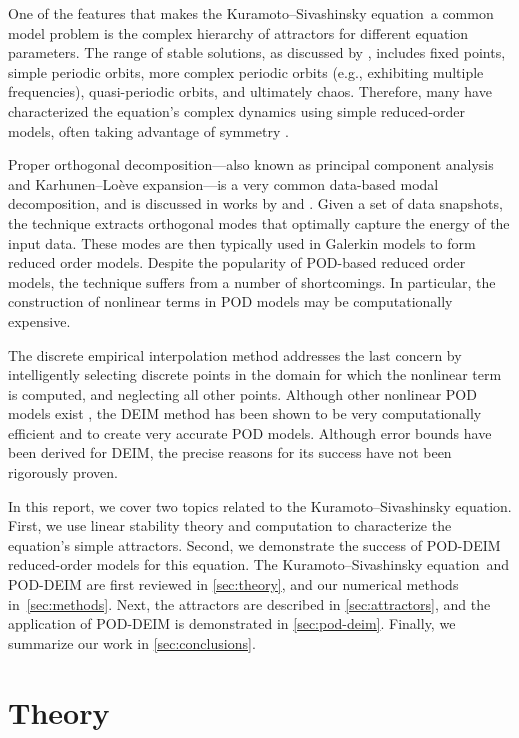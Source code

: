 \documentclass[11pt]{article}
\newcommand{\KSE}{Kuramoto--Sivashinsky equation}
\begin{document}
One of the features that makes the \KSE\ a common model problem is the complex hierarchy of attractors for different equation parameters.
The range of stable solutions, as discussed by \cite{KevrekidisSIAMJAM90}, includes fixed points, simple periodic orbits, more complex periodic orbits (e.g., exhibiting multiple frequencies), quasi-periodic orbits, and ultimately chaos.
Therefore, many have characterized the equation's complex dynamics using simple reduced-order models, often taking advantage of symmetry \citep[e.g.,][]{AubrySIAMJSC93, RowleyPD00}.

Proper orthogonal decomposition---also known as principal component analysis and Karhunen--Lo\`eve expansion---is a very common data-based modal decomposition, and is discussed in works by \cite{SirovichQAM87} and \cite{HolmesTCSDSS}.
Given a set of data snapshots, the technique extracts orthogonal modes that optimally capture the energy of the input data.
These modes are then typically used in Galerkin models to form reduced order models.
Despite the popularity of POD-based reduced order models, the technique suffers from a number of shortcomings.
In particular, the construction of nonlinear terms in POD models may be computationally expensive.

The discrete empirical interpolation method \citep[DEIM;][]{ChaturantabutIEEECDC09, ChaturantabutRice09a} addresses the last concern by intelligently selecting discrete points in the domain for which the nonlinear term is computed, and neglecting all other points.
Although other nonlinear POD models exist \citep[see, e.g.,][]{NoackJFM03}, the DEIM method has been shown to be very computationally efficient and to create very accurate POD models.
Although error bounds have been derived for DEIM, the precise reasons for its success have not been rigorously proven.

In this report, we cover two topics related to the \KSE.
First, we use linear stability theory and computation to characterize the equation's simple attractors.
Second, we demonstrate the success of POD-DEIM reduced-order models for this equation.
The \KSE\ and POD-DEIM are first reviewed in \autoref{sec:theory}, and our numerical methods in~\autoref{sec:methods}.
Next, the attractors are described in \autoref{sec:attractors}, and the application of POD-DEIM is demonstrated in \autoref{sec:pod-deim}.
Finally, we summarize our work in \autoref{sec:conclusions}.

\section{Theory}
\label{sec:theory}
\end{document}

